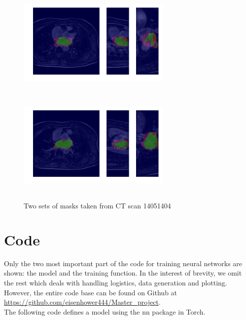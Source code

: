 \begin{figure}[H]
\centering
\label{final_model}
\begin{minipage}{0.45\textwidth}
\centering
{\includegraphics[trim=0cm 2cm 0cm 2cm, clip=true, height=50mm, width=75mm]{Appendix/img/Masks_for_14051404_0.png}}
\end{minipage}\hfill
\begin{minipage}{0.45\textwidth}
\centering
{\includegraphics[trim=0cm 2cm 0cm 2cm, clip=true, height=50mm, width=75mm]{Appendix/img/Masks_for_14051404_1.png}}
\end{minipage}
\caption{Two sets of masks taken from CT scan 14051404}
\end{figure}

\chapter{Code}

\lstset{style=myLuastyle}

Only the two most important part of the code for training neural networks are shown: the model and the training function. In the interest of brevity, we omit the rest which deals with handling logistics, data generation and plotting. However, the entire code base can be found on Github at \url{https://github.com/eisenhower444/Master_project}.\\

\noindent The following code defines a model using the nn package in Torch.\\

